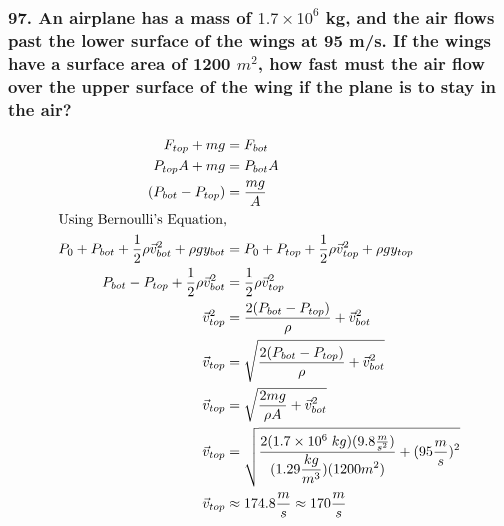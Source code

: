 \documentclass{article}
\begin{document}
\subsubsection*{
    97. An airplane has a mass of $1.7 \times 10^6$ kg, and the air flows
    past the lower surface of the wings at 95 m/s. If the wings have
    a surface area of 1200 $m^2$, how fast must the air flow over the
    upper surface of the wing if the plane is to stay in the air?
}
\begin{align*}
    F_{top} + mg &= F_{bot} \\
    P_{top}A + mg &= P_{bot}A \\
    (P_{bot} - P_{top}) &= \displaystyle\frac{mg}{A} \\
    \intertext{Using Bernoulli's Equation,}
    P_0 + P_{bot} + \frac 1 2 \rho\vec v_{bot}^2 + \rho gy_{bot} &= P_0 + P_{top} + \frac 1 2 \rho\vec v_{top}^2 + \rho gy_{top} \\
    P_{bot} - P_{top} + \frac 1 2 \rho\vec v_{bot}^2 &= \frac 1 2 \rho\vec
    v_{top}^2 \\
    \vec v_{top}^2 &= \displaystyle\frac{2(P_{bot} - P_{top})}{\rho} + \vec
    v_{bot}^2 \\
    \vec v_{top} &= \sqrt{\displaystyle\frac{2(P_{bot} - P_{top})}{\rho} + \vec
    v_{bot}^2} \\
    \vec v_{top} &= \sqrt{\displaystyle\frac{2mg}{\rho A}+ \vec v_{bot}^2} \\
    \vec v_{top} &= \sqrt{\displaystyle\frac{2(1.7 \times 10^6\;kg)(9.8 \frac m
    {s^2})}{(1.29 \displaystyle\frac{kg}{m^3})(1200m^2)}+ (95\frac m s)^2} \\
    \vec v_{top} &\approx 174.8 \frac m s \approx 170 \frac m s
\end{align*}
\end{document}
